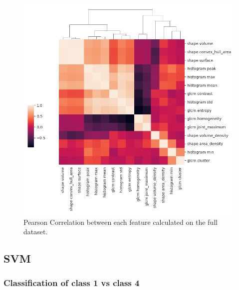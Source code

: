 \begin{figure}[H]
    \centering
    \includegraphics[width=1\textwidth]{Figures/feature_correlation.png}
    \caption{Pearson Correlation between each feature calculated on the full
    dataset. }  
    \label{fig:correlation} 
\end{figure}








\subsection{SVM}

\subsubsection{Classification of class 1 vs class 4}

